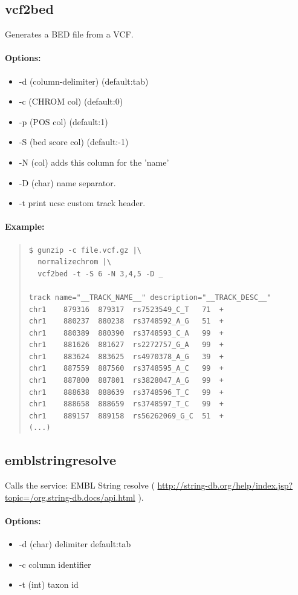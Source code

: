 \documentclass[12pt]{article}
\begin{document}
\subsection{vcf2bed}
Generates a BED file from a VCF.

\paragraph{Options:}
\begin{itemize}
\item-d (column-delimiter) (default:tab)
\item-c (CHROM col) (default:0)
\item-p (POS col) (default:1)
\item-S (bed score col) (default:-1)
\item-N (col) adds this column for the 'name'
\item-D (char) name separator.
\item-t print ucsc custom track header.
\end{itemize}
\paragraph{Example:}

\begin{quote}
\begin{verbatim}
$ gunzip -c file.vcf.gz |\
  normalizechrom |\
  vcf2bed -t -S 6 -N 3,4,5 -D _

track name="__TRACK_NAME__" description="__TRACK_DESC__" 
chr1	879316	879317	rs7523549_C_T	71	+
chr1	880237	880238	rs3748592_A_G	51	+
chr1	880389	880390	rs3748593_C_A	99	+
chr1	881626	881627	rs2272757_G_A	99	+
chr1	883624	883625	rs4970378_A_G	39	+
chr1	887559	887560	rs3748595_A_C	99	+
chr1	887800	887801	rs3828047_A_G	99	+
chr1	888638	888639	rs3748596_T_C	99	+
chr1	888658	888659	rs3748597_T_C	99	+
chr1	889157	889158	rs56262069_G_C	51	+
(...)
\end{verbatim}
\end{quote}

\subsection{emblstringresolve}
Calls the service: EMBL String resolve ( \url{http://string-db.org/help/index.jsp?topic=/org.string-db.docs/api.html} ).

\paragraph{Options:}
\begin{itemize}
\item-d (char) delimiter default:tab
\item-c column identifier
\item-t (int) taxon id
\end{itemize}
\end{document}
